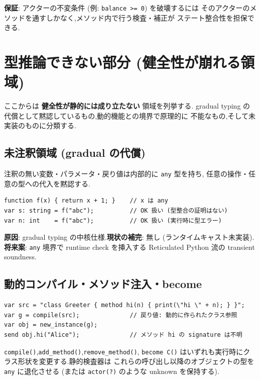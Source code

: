 \documentclass[11pt,a4paper]{article}
\newcommand{\code}[1]{\texttt{\small #1}}
\begin{document}
\textbf{保証}: アクターの不変条件 (例: \code{balance >= 0}) を破壊するには
そのアクターのメソッドを通すしかなく,メソッド内で行う検査・補正が
ステート整合性を担保できる.

\section{型推論できない部分 (健全性が崩れる領域)}
\label{sec:unsound}

ここからは \textbf{健全性が静的には成り立たない} 領域を列挙する.
gradual typing の代償として黙認しているもの,動的機能との境界で原理的に
不能なもの,そして未実装のものに分類する.

\subsection{未注釈領域 (gradual の代償)}

注釈の無い変数・パラメータ・戻り値は内部的に \code{any} 型を持ち,
任意の操作・任意の型への代入を黙認する.

\begin{lstlisting}
function f(x) { return x + 1; }    // x は any
var s: string = f("abc");          // OK 扱い (型整合の証明はない)
var n: int    = f("abc");          // OK 扱い (実行時に型エラー)
\end{lstlisting}

\textbf{原因}: gradual typing の中核仕様.\textbf{現状の補完}: 無し
(ランタイムキャスト未実装).\textbf{将来案}: \code{any} 境界で
runtime check を挿入する Reticulated Python 流の transient soundness.

\subsection{動的コンパイル・メソッド注入・become}
\label{sec:dyn}

\begin{lstlisting}
var src = "class Greeter { method hi(n) { print(\"hi \" + n); } }";
var g = compile(src);              // 戻り値: 動的に作られたクラス参照
var obj = new_instance(g);
send obj.hi("Alice");              // メソッド hi の signature は不明
\end{lstlisting}

\code{compile()},\code{add\_method()},\code{remove\_method()},
\code{become C()} はいずれも実行時にクラス形状を変更する.静的検査器は
これらの呼び出し以降のオブジェクトの型を \code{any} に退化させる
(または \code{actor(?)} のような unknown を保持する).
\end{document}
